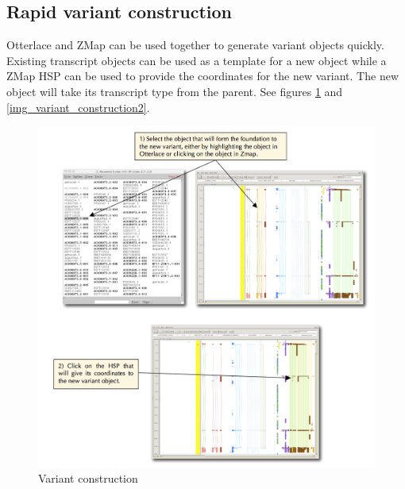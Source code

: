 \documentclass[letterpaper]{article}
\begin{document}
\subsection{Rapid variant construction}
Otterlace and ZMap can be used together to generate variant objects quickly. Existing transcript objects can be used as a template for a new object while a ZMap HSP can be used to provide the coordinates for the new variant. The new object will take its transcript type from the parent. See figures \ref{img_variant_construction} and \ref{img_variant_construction2}.

\begin{figure}
\centering
\color[rgb]{0.30980393,0.5058824,0.7411765}
\includegraphics[width=15.231cm]{img_variant_construction.png}
\caption{Variant construction}
\label{img_variant_construction}
\end{figure}
\end{document}
